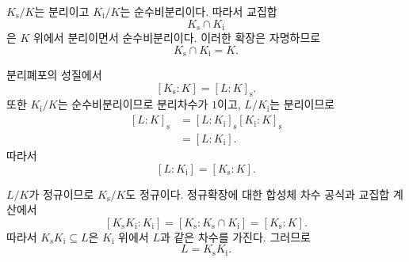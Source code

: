\begin{solution}
$K_{\mathrm s}/K$는 분리이고 $K_{\mathrm i}/K$는 순수비분리이다. 따라서 교집합
\[
  K_{\mathrm s}\cap K_{\mathrm i}
\]
은 $K$ 위에서 분리이면서 순수비분리이다. 이러한 확장은 자명하므로
\[
  K_{\mathrm s}\cap K_{\mathrm i}=K.
\]

분리폐포의 성질에서
\[
  [K_{\mathrm s}:K]=[L:K]_{\mathrm s}.
\]
또한 $K_{\mathrm i}/K$는 순수비분리이므로 분리차수가 $1$이고, $L/K_{\mathrm i}$는 분리이므로
\[
\begin{aligned}
  [L:K]_{\mathrm s}
  &=[L:K_{\mathrm i}]_{\mathrm s}
    [K_{\mathrm i}:K]_{\mathrm s}\\
  &=[L:K_{\mathrm i}].
\end{aligned}
\]
따라서
\[
  [L:K_{\mathrm i}]=[K_{\mathrm s}:K].
\]

$L/K$가 정규이므로 $K_{\mathrm s}/K$도 정규이다. 정규확장에 대한 합성체 차수 공식과 교집합 계산에서
\[
  [K_{\mathrm s}K_{\mathrm i}:K_{\mathrm i}]
  =[K_{\mathrm s}:K_{\mathrm s}\cap K_{\mathrm i}]
  =[K_{\mathrm s}:K].
\]
따라서 $K_{\mathrm s}K_{\mathrm i}\subseteq L$은 $K_{\mathrm i}$ 위에서 $L$과 같은 차수를 가진다. 그러므로
\[
  L=K_{\mathrm s}K_{\mathrm i}.
\]
\end{solution}
